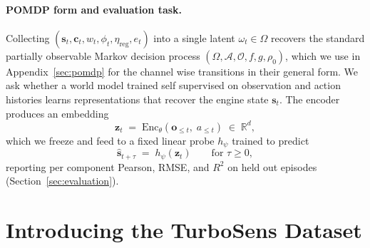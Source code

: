 \documentclass{article}
\begin{document}
\paragraph{POMDP form and evaluation task.}
Collecting $(\mathbf{s}_t, \mathbf{c}_t, w_t, \phi_t, \eta_\mathrm{reg}, e_t)$ into a single latent $\omega_t \in \Omega$ recovers the standard partially observable Markov decision process $(\Omega, \mathcal{A}, \mathcal{O}, f, g, \rho_0)$, which we use in Appendix~\ref{sec:pomdp} for the channel wise transitions in their general form. We ask whether a world model trained self supervised on observation and action histories learns representations that recover the engine state $\mathbf{s}_t$. The encoder produces an embedding
\begin{equation}
    \mathbf{z}_t \;=\; \mathrm{Enc}_\theta(\mathbf{o}_{\le t},\; a_{\le t}) \;\in\; \mathbb{R}^d,
\end{equation}
which we freeze and feed to a fixed linear probe $h_\psi$ trained to predict
\begin{equation}
    \hat{\mathbf{s}}_{t+\tau} \;=\; h_\psi(\mathbf{z}_t) \qquad \text{for } \tau \ge 0,
    \label{eq:probe}
\end{equation}
reporting per component Pearson, RMSE, and $R^2$ on held out episodes (Section~\ref{sec:evaluation}).


\section{Introducing the TurboSens Dataset}
\label{sec:dataset}
\end{document}
